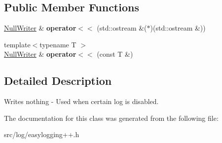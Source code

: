 \subsection*{Public Member Functions}
\begin{DoxyCompactItemize}
\item 
\hyperlink{classel_1_1base_1_1NullWriter}{Null\+Writer} \& {\bfseries operator$<$$<$} (std\+::ostream \&($\ast$)(std\+::ostream \&))\hypertarget{classel_1_1base_1_1NullWriter_a39cb7d47986d70c2b4e9d78d1482da7d}{}\label{classel_1_1base_1_1NullWriter_a39cb7d47986d70c2b4e9d78d1482da7d}

\item 
{\footnotesize template$<$typename T $>$ }\\\hyperlink{classel_1_1base_1_1NullWriter}{Null\+Writer} \& {\bfseries operator$<$$<$} (const T \&)\hypertarget{classel_1_1base_1_1NullWriter_a57cb0f5d93ebac076b8ef94d6eff65a2}{}\label{classel_1_1base_1_1NullWriter_a57cb0f5d93ebac076b8ef94d6eff65a2}

\end{DoxyCompactItemize}


\subsection{Detailed Description}
Writes nothing -\/ Used when certain log is disabled. 

The documentation for this class was generated from the following file\+:\begin{DoxyCompactItemize}
\item 
src/log/easylogging++.\+h\end{DoxyCompactItemize}
